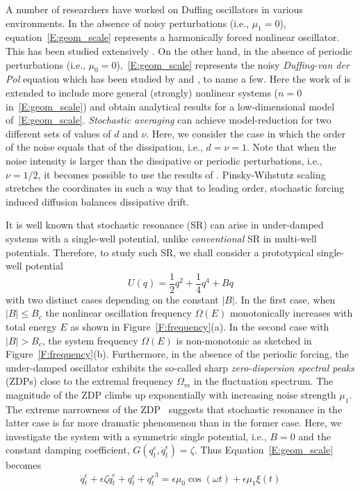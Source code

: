 A number of researchers have worked on Duffing oscillators in various environments. In the absence of noisy perturbations (i.e., $\mu_1=0$), equation~\eqref{E:geom_scale} represents a harmonically forced nonlinear oscillator. This has been studied extensively \citep{guckenheimer83:_nonlin, nayfeh79:_nonlin_oscil}. On the other hand, in the absence of periodic perturbations (i.e., $\mu_0 = 0$),~\eqref{E:geom_scale} represents the noisy \emph{Duffing-van der Pol} equation which has been studied by \citet{arnold96:_towar_hopf, liang99:_stoch_dynam, lin67:_probab_theor_struc_dynam} and \citet{bolotin84:_random}, to name a few. Here the work of \citet{namachchivaya01:_unified_approac_noisy_nonlin_mathieu_type_system} is extended to include more general (strongly) nonlinear systems ($n=0$ in~\eqref{E:geom_scale}) and obtain analytical results for a low-dimensional model of~\eqref{E:geom_scale}. \emph{Stochastic averaging} can achieve model-reduction for two different sets of values of $d$ and $\nu$. Here, we consider the case in which the order of the noise equals that of the dissipation, i.e., $d = \nu = 1$. Note that when the noise intensity is larger than the dissipative or periodic perturbations, i.e., $\nu=1/2$, it becomes possible to use the results of \citet{pinsky88:_lyapun}. Pinsky-Wihstutz scaling stretches the coordinates in such a way that to leading order, stochastic forcing induced diffusion balances dissipative drift.

It is well known that stochastic resonance (SR) can arise in under-damped systems with a single-well potential, unlike \emph{conventional} SR in multi-well potentials. Therefore, to study such SR, we shall consider a prototypical single-well potential
\[
U(q) = \frac12 q^2 + \frac14 q^4 + Bq
\]
with two distinct cases depending on the constant $|B|$. In the first case, when $|B| \le B_c$ the nonlinear oscillation frequency $\Omega(E)$ monotonically increases with total energy $E$ as shown in Figure~\ref{F:frequency}(a). In the second case with $|B| > B_c$, the system frequency $\Omega(E)$ is non-monotonic as sketched in Figure~\ref{F:frequency}(b). Furthermore, in the absence of the periodic forcing, the under-damped oscillator exhibits the so-called sharp \emph{zero-dispersion spectral peaks} (ZDPs) close to the extremal frequency $\Omega_m$ in the fluctuation spectrum. The magnitude of the ZDP climbs up exponentially with increasing noise strength $\mu_1$. The extreme narrowness of the ZDP~\citet{soskin89:_fluct, soskin92:_evolut} suggests that stochastic resonance in the latter case is far more dramatic phenomenon than in the former case. Here, we investigate the system with a symmetric single potential, i.e., $B=0$ and the constant damping coefficient, $G(q^\epsilon_t,\dot q_t^\epsilon) = \zeta$. Thus Equation~\eqref{E:geom_scale} becomes
\[
\ddot q_t^\epsilon + \epsilon \zeta \dot q_t^\epsilon + q_t^\epsilon + {q_t^\epsilon}^3 = \epsilon \mu_0 \cos (\omega t) + \epsilon \mu_1 \xi(t)
\]

